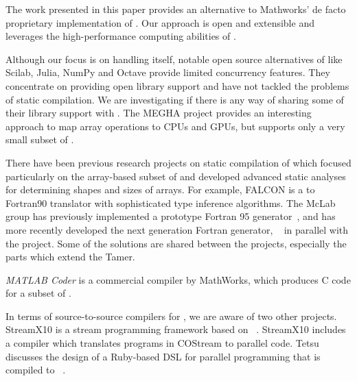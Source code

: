 The work presented in this paper provides an alternative to Mathworks' de
facto proprietary implementation of \matlab.   Our approach is open and
extensible and leverages the high-performance computing abilities of
\xten.

Although our focus is on handling \matlab itself, notable open source
alternatives of \matlab like Scilab\cite{Scilab}, Julia\cite{julia},
NumPy\cite{numpy} and Octave\cite{Octave} provide limited concurrency features.
They concentrate on providing open library support and have not tackled the
problems of static compilation.  We are investigating if there is any way of
sharing some of their library support with \mixten.  The MEGHA
project\cite{megha} provides an interesting approach to map \matlab array
operations to CPUs and GPUs, but supports only a very small subset of \matlab.  


There have been  previous research projects on static compilation of
\matlab which focused particularly on the array-based subset of \matlab
and developed advanced static analyses for determining shapes and sizes
of arrays.  For example, FALCON \cite{falcon} is a \matlab to {\sc
Fortran90} translator with sophisticated type inference algorithms.
The McLab group has previously implemented a prototype Fortran 95
generator~\cite{McForThesis}, and has more recently developed the next generation
Fortran generator, \mctwofor~\cite{mc2for} in parallel with the \mixten project.   Some of the
solutions are shared between the projects, especially the parts which
extend the Tamer.  

\textit{MATLAB Coder} is a commercial compiler by MathWorks\cite{MATLABCoder},
which produces C code for a subset of \matlab. 

In terms of source-to-source compilers for \xten, we are aware of two
other projects.  StreamX10 is a stream programming framework based on
\xten~\cite{Wei-2012}.  StreamX10  includes a compiler which translates
programs in COStream to parallel \xten code.  Tetsu discusses the design
of a Ruby-based DSL for parallel programming that is compiled to
\xten~\cite{Tetsu-2011}.
